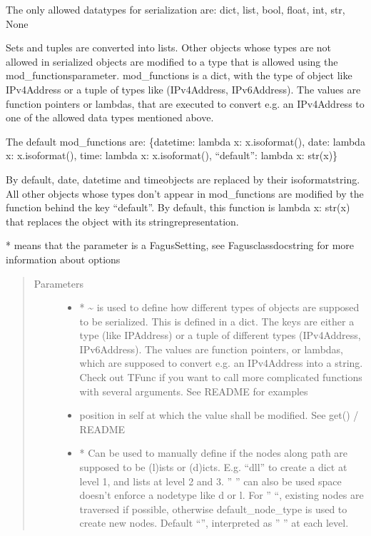\documentclass[a4paper,10pt,english]{sphinxmanual}
\begin{document}
\begin{fulllineitems}
\begin{fulllineitems}
\sphinxAtStartPar
The only allowed data\sphinxhyphen{}types for serialization are: dict, list, bool, float, int, str, None

\sphinxAtStartPar
Sets and tuples are converted into lists. Other objects whose types are not allowed in serialized objects are
modified to a type that is allowed using the mod\_functions\sphinxhyphen{}parameter. mod\_functions is a dict, with the type
of object like IPv4Address or a tuple of types like (IPv4Address, IPv6Address). The values are function pointers
or lambdas, that are executed to convert e.g. an IPv4Address to one of the allowed data types mentioned above.

\sphinxAtStartPar
The default mod\_functions are: \{datetime: lambda x: x.isoformat(), date: lambda x: x.isoformat(), time:
lambda x: x.isoformat(), “default”: lambda x: str(x)\}

\sphinxAtStartPar
By default, date, datetime and time\sphinxhyphen{}objects are replaced by their isoformat\sphinxhyphen{}string. All other objects whose
types don’t appear in mod\_functions are modified by the function behind the key “default”. By default, this
function is lambda x: str(x) that replaces the object with its string\sphinxhyphen{}representation.

\sphinxAtStartPar
* means that the parameter is a Fagus\sphinxhyphen{}Setting, see Fagus\sphinxhyphen{}class\sphinxhyphen{}docstring for more information about options
\begin{quote}\begin{description}
\item[{Parameters}] \leavevmode\begin{itemize}
\item {}
\sphinxAtStartPar
{} \textendash{} * \textasciitilde{} is used to define how different types of objects are supposed to be serialized. This is
defined in a dict. The keys are either a type (like IPAddress) or a tuple of different types
(IPv4Address, IPv6Address). The values are function pointers, or lambdas, which are supposed to convert
e.g. an IPv4Address into a string. Check out TFunc if you want to call more complicated functions with
several arguments. See README for examples

\item {}
\sphinxAtStartPar
{} \textendash{} position in self at which the value shall be modified. See get() / README

\item {}
\sphinxAtStartPar
{} \textendash{} * Can be used to manually define if the nodes along path are supposed to be (l)ists or
(d)icts. E.g. “dll” to create a dict at level 1, and lists at level 2 and 3. ” ” can also be used \sphinxhyphen{}
space doesn’t enforce a node\sphinxhyphen{}type like d or l. For ” “, existing nodes are traversed if possible,
otherwise default\_node\_type is used to create new nodes. Default “”, interpreted as ” ” at each level.


\end{itemize}
\end{description}
\end{quote}
\end{fulllineitems}
\end{fulllineitems}
\end{document}
